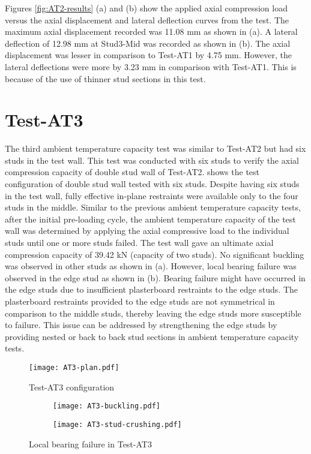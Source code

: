 Figures \ref{fig:AT2-results} (a) and (b) show the applied axial compression load versus the axial displacement and lateral deflection curves from the test. The maximum axial displacement recorded was 11.08 mm as shown in  (a). A lateral deflection of 12.98 mm at Stud3-Mid was recorded as shown in  (b). The axial displacement was lesser in comparison to Test-AT1 by 4.75 mm. However, the lateral deflections were more by 3.23 mm in comparison with Test-AT1. This is because of the use of thinner stud sections in this test.

\section{Test-AT3}\label{sec:AT3}

The third ambient temperature capacity test was similar to Test-AT2 but had six studs in the test wall. This test was conducted with six studs to verify the axial compression capacity of double stud wall of Test-AT2.  shows the test configuration of double stud wall tested with six studs. Despite having six studs in the test wall, fully effective in-plane restraints were available only to the four studs in the middle. Similar to the previous ambient temperature capacity tests, after the initial pre-loading cycle, the ambient temperature capacity of the test wall was determined by applying the axial compressive load to the individual studs until one or more studs failed. The test wall gave an ultimate axial compression capacity of 39.42 kN (capacity of two studs). No significant buckling was observed in other studs as shown in  (a). However, local bearing failure was observed in the edge stud as shown in  (b). Bearing failure might have occurred in the edge studs due to insufficient plasterboard restraints to the edge studs. The plasterboard restraints provided to the edge studs are not symmetrical in comparison to the middle studs, thereby leaving the edge studs more susceptible to failure. This issue can be addressed by strengthening the edge studs by providing nested or back to back stud sections in ambient temperature capacity tests. 
\begin{figure}[!htbp]
	\centering
			\texttt{[image: AT3-plan.pdf]}\\
		\caption{Test-AT3 configuration}
		\label{fig:AT3-plan}
\end{figure} 
\begin{figure}[!htbp]
	\centering
	\begin{subfigure}[b]{0.6\textwidth}
		\centering
		\texttt{[image: AT3-buckling.pdf]}
		\caption{}
		\label{subfig:AT3-stud-buckling}
	\end{subfigure}
	\begin{subfigure}[b]{0.5\textwidth}
		\centering
		\texttt{[image: AT3-stud-crushing.pdf]}
		\caption{}
		\label{subfig:AT3-stud-crushing}
	\end{subfigure}
	   \caption{Local bearing failure in Test-AT3}
	   \label{fig:AT3-buckling}
\end{figure} 

